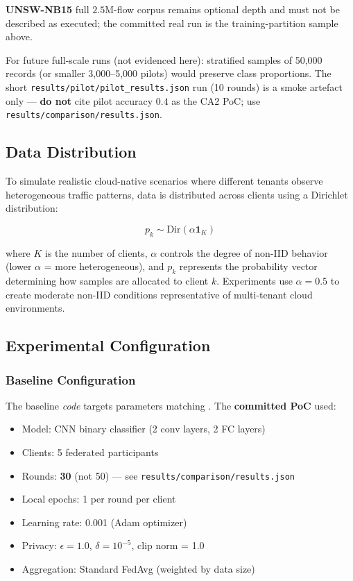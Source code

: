 \textbf{UNSW-NB15} \citep{moustafa2015unsw} full $2.5$M-flow corpus remains optional depth and must not be described as executed; the committed real run is the training-partition sample above.

For future full-scale runs (not evidenced here): stratified samples of 50,000 records (or smaller 3,000--5,000 pilots) would preserve class proportions. The short \texttt{results/pilot/pilot\_results.json} run (10 rounds) is a smoke artefact only --- \textbf{do not} cite pilot accuracy $0.4$ as the CA2 PoC; use \texttt{results/comparison/results.json}.


\subsection{Data Distribution}

To simulate realistic cloud-native scenarios where different tenants observe heterogeneous traffic patterns, data is distributed across clients using a Dirichlet distribution:

\begin{equation}
p_k \sim \text{Dir}(\alpha \mathbf{1}_K)
\end{equation}

where $K$ is the number of clients, $\alpha$ controls the degree of non-IID behavior (lower $\alpha$ = more heterogeneous), and $p_k$ represents the probability vector determining how samples are allocated to client $k$. Experiments use $\alpha = 0.5$ to create moderate non-IID conditions representative of multi-tenant cloud environments.

\subsection{Experimental Configuration}

\subsubsection{Baseline Configuration}

The baseline \emph{code} targets parameters matching \citet{saklani2026privacy}. The \textbf{committed PoC} used:

\begin{itemize}
    \item Model: CNN binary classifier (2 conv layers, 2 FC layers)
    \item Clients: 5 federated participants
    \item Rounds: \textbf{30} (not 50) --- see \texttt{results/comparison/results.json}
    \item Local epochs: 1 per round per client
    \item Learning rate: 0.001 (Adam optimizer)
    \item Privacy: $\epsilon = 1.0$, $\delta = 10^{-5}$, clip norm = 1.0
    \item Aggregation: Standard FedAvg (weighted by data size)
\end{itemize}

